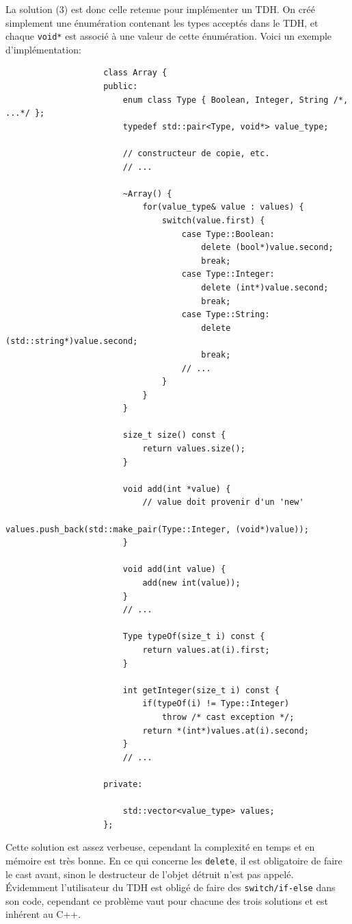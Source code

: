 \documentclass[french]{article}
\begin{document}
		La solution (3) est donc celle retenue pour implémenter un TDH. On créé simplement une énumération contenant les types acceptés dans le TDH, et chaque \texttt{void*} est associé à une valeur de cette énumération. Voici un exemple d'implémentation:
		
		\begin{lstlisting}
					class Array {
					public:
						enum class Type { Boolean, Integer, String /*, ...*/ };
						typedef std::pair<Type, void*> value_type;
						
						// constructeur de copie, etc.
						// ...
						
						~Array() {
							for(value_type& value : values) {
								switch(value.first) {
									case Type::Boolean:
										delete (bool*)value.second;
										break;
									case Type::Integer:
										delete (int*)value.second;
										break;
									case Type::String:
										delete (std::string*)value.second;
										break;
									// ...
								}
							}
						}
						
						size_t size() const {
							return values.size();
						}
						
						void add(int *value) { 
							// value doit provenir d'un 'new'
							values.push_back(std::make_pair(Type::Integer, (void*)value));
						}
						
						void add(int value) {
							add(new int(value));
						}
						// ...
						
						Type typeOf(size_t i) const {
							return values.at(i).first;
						}
						
						int getInteger(size_t i) const {
							if(typeOf(i) != Type::Integer)
								throw /* cast exception */;
							return *(int*)values.at(i).second;
						}
						// ...
						
					private:
						
						std::vector<value_type> values;
					};
		\end{lstlisting}
		
		Cette solution est assez verbeuse, cependant la complexité en temps et en mémoire est très bonne. En ce qui concerne les \texttt{delete}, il est obligatoire de faire le cast avant, sinon le destructeur de l'objet détruit n'est pas appelé.\\
		
		Évidemment l'utilisateur du TDH est obligé de faire des \texttt{switch/if-else} dans son code, cependant ce problème vaut pour chacune des trois solutions et est inhérent au C++.  
		
\end{document}
